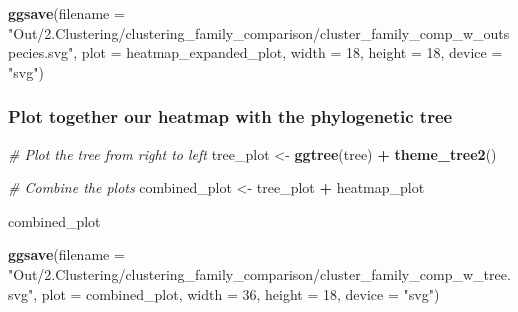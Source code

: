 \documentclass[
]{article}
\newenvironment{Shaded}{\begin{snugshade}}{\end{snugshade}}
\newcommand{\AttributeTok}[1]{\textcolor[rgb]{0.13,0.29,0.53}{#1}}
\newcommand{\CommentTok}[1]{\textcolor[rgb]{0.56,0.35,0.01}{\textit{#1}}}
\newcommand{\DecValTok}[1]{\textcolor[rgb]{0.00,0.00,0.81}{#1}}
\newcommand{\FunctionTok}[1]{\textcolor[rgb]{0.13,0.29,0.53}{\textbf{#1}}}
\newcommand{\NormalTok}[1]{#1}
\newcommand{\OtherTok}[1]{\textcolor[rgb]{0.56,0.35,0.01}{#1}}
\newcommand{\SpecialCharTok}[1]{\textcolor[rgb]{0.81,0.36,0.00}{\textbf{#1}}}
\newcommand{\StringTok}[1]{\textcolor[rgb]{0.31,0.60,0.02}{#1}}
\begin{document}


\begin{Shaded}
\begin{Highlighting}[]
\FunctionTok{ggsave}\NormalTok{(}\AttributeTok{filename =} \StringTok{"Out/2.Clustering/clustering\_family\_comparison/cluster\_family\_comp\_w\_outspecies.svg"}\NormalTok{, }\AttributeTok{plot =}\NormalTok{ heatmap\_expanded\_plot, }\AttributeTok{width =} \DecValTok{18}\NormalTok{, }\AttributeTok{height =} \DecValTok{18}\NormalTok{, }\AttributeTok{device =} \StringTok{"svg"}\NormalTok{)}
\end{Highlighting}
\end{Shaded}

\hypertarget{plot-together-our-heatmap-with-the-phylogenetic-tree}{%
\subsubsection{Plot together our heatmap with the phylogenetic
tree}\label{plot-together-our-heatmap-with-the-phylogenetic-tree}}

\begin{Shaded}
\begin{Highlighting}[]
\CommentTok{\# Plot the tree from right to left}
\NormalTok{tree\_plot }\OtherTok{\textless{}{-}} \FunctionTok{ggtree}\NormalTok{(tree) }\SpecialCharTok{+} \FunctionTok{theme\_tree2}\NormalTok{()}

\CommentTok{\# Combine the plots}
\NormalTok{combined\_plot }\OtherTok{\textless{}{-}}\NormalTok{ tree\_plot }\SpecialCharTok{+}\NormalTok{ heatmap\_plot}

\NormalTok{combined\_plot}
\end{Highlighting}
\end{Shaded}



\begin{Shaded}
\begin{Highlighting}[]
\FunctionTok{ggsave}\NormalTok{(}\AttributeTok{filename =} \StringTok{"Out/2.Clustering/clustering\_family\_comparison/cluster\_family\_comp\_w\_tree.svg"}\NormalTok{, }\AttributeTok{plot =}\NormalTok{ combined\_plot, }\AttributeTok{width =} \DecValTok{36}\NormalTok{, }\AttributeTok{height =} \DecValTok{18}\NormalTok{, }\AttributeTok{device =} \StringTok{"svg"}\NormalTok{)}
\end{Highlighting}
\end{Shaded}
\end{document}
